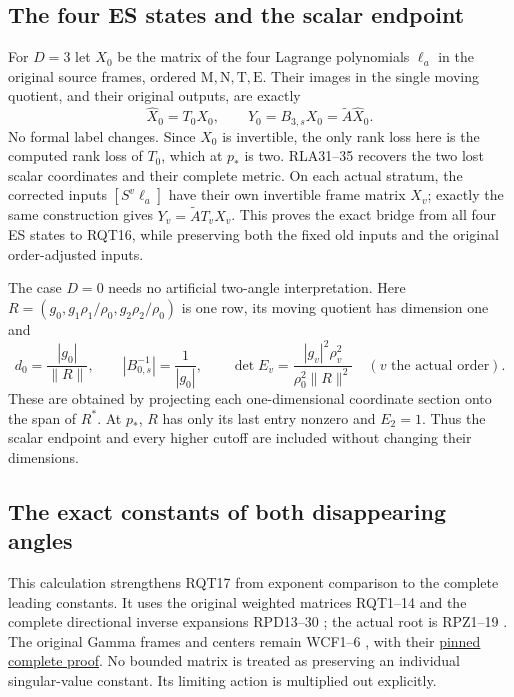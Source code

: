 \documentclass[11pt]{article}
\begin{document}
\subsection{The four ES states and the scalar endpoint}
For $D=3$ let $X_0$ be the matrix of the four Lagrange polynomials
$\ell_a$ in the original source frames, ordered
$\mathrm M,\mathrm N,\mathrm T,\mathrm E$.  Their images in the
single moving quotient, and their original outputs, are exactly
\[
 \widehat X_0=T_0X_0,\qquad
 Y_0=B_{3,s}X_0=\widetilde A\widehat X_0.
 \tag{RQT18}
\]
No formal label changes.  Since $X_0$ is invertible, the only
rank loss here is the computed rank loss of $T_0$, which at
$p_*$ is two.  RLA31--35 recovers the two lost scalar
coordinates and their complete metric.  On each actual stratum,
the corrected inputs $[S^v\ell_a]$ have their own invertible
frame matrix $X_v$; exactly the same construction gives
$Y_v=\widetilde A T_vX_v$.  This proves the exact bridge from
all four ES states to RQT16, while preserving both the fixed
old inputs and the original order-adjusted inputs.

The case $D=0$ needs no artificial two-angle interpretation.
Here $R=(g_0,g_1\rho_1/\rho_0,g_2\rho_2/\rho_0)$ is one row,
its moving quotient has dimension one and
\[
 d_0=\frac{|g_0|}{\|R\|},\qquad
 |B_{0,s}^{-1}|=\frac1{|g_0|},\qquad
 \det E_v=\frac{|g_v|^2\rho_v^2}{\rho_0^2\|R\|^2}
 \quad(v\text{ the actual order}).
 \tag{RQT19}
\]
These are obtained by projecting each one-dimensional coordinate
section onto the span of $R^*$.  At $p_*$, $R$ has only its
last entry nonzero and $E_2=1$.  Thus the scalar endpoint and
every higher cutoff are included without changing their dimensions.

\subsection{The exact constants of both disappearing angles}
This calculation strengthens RQT17 from exponent comparison to the
complete leading constants.  It uses the original weighted matrices
RQT1--14 and the complete directional inverse expansions
RPD13--30 \cite{RPD006}; the actual root is RPZ1--19 \cite{RPZ005}.
The original Gamma frames and centers remain WCF1--6 \cite{WCF},
with their
\href{https://github.com/KokunoYumeto/zeta-function-research-reader/blob/5992ad50c0f2a06921f1fcaded7b4e38097c0739/workbenches/splitzero-tandem/continuations/20260920-original-kernel-mixed-determinants/providers/WEIGHTED_CONDUCTOR_FORWARD.tex#L28}{pinned complete proof}.
No bounded matrix is treated as preserving an individual singular-value
constant.  Its limiting action is multiplied out explicitly.
\end{document}
